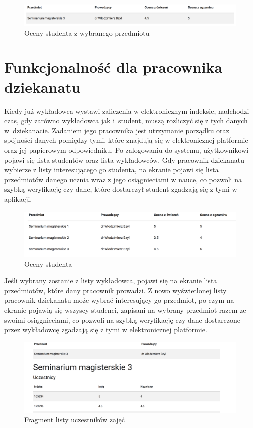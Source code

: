 \documentclass[openright]{xmgr}
\begin{document}
\begin{figure}[th!]
\centering
\includegraphics[width=0.7\hsize]{images/studentGrade}
\caption{Oceny studenta z wybranego przedmiotu\label{RYS.12}}
\end{figure}

\section{Funkcjonalność dla pracownika dziekanatu}
\indent \indent \indent Kiedy już wykładowca wystawi zaliczenia w elektronicznym indeksie, nadchodzi czas, gdy zarówno wykładowca jak i~student, muszą rozliczyć się z tych danych w~dziekanacie. Zadaniem jego pracownika jest utrzymanie porządku oraz spójności danych pomiędzy tymi, które znajdują się w elektronicznej platformie oraz jej papierowym odpowiedniku. Po zalogowaniu do systemu, użytkownikowi pojawi się lista studentów oraz lista wykładowców. Gdy pracownik dziekanatu  wybierze z listy interesującego go studenta, na ekranie pojawi się lista przedmiotów danego ucznia wraz z jego osiągnieciami w nauce, co pozwoli na szybką weryfikację czy dane, które dostarczył student zgadzają się z tymi w aplikacji.

\begin{figure}[th!]
\centering
\includegraphics[width=0.7\hsize]{images/studentGrades}
\caption{Oceny studenta\label{RYS.13}}
\end{figure}

\noindent Jeśli wybrany zostanie z listy wykładowca, pojawi się na ekranie lista przedmiotów, które dany pracownik prowadzi. Z nowo wyświetlonej listy pracownik dziekanatu może wybrać interesujący go przedmiot, po czym na ekranie pojawią się wszyscy studenci, zapisani na wybrany przedmiot razem ze swoimi osiągnieciami, co pozwoli na szybką weryfikację czy dane dostarczone przez wykładowcę zgadzają się z tymi w elektronicznej platformie.

 \begin{figure}[th!]
\centering
\includegraphics[width=0.61\hsize]{images/deaneryList}
\caption{Fragment listy uczestników zajęć\label{RYS.14}}
\end{figure}
\end{document}

